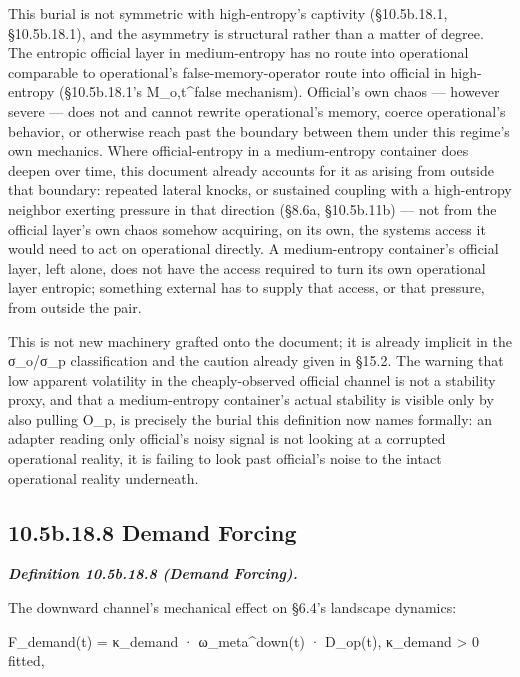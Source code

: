 \documentclass[
]{article}
\begin{document}
This burial is not symmetric with high-entropy's captivity (§10.5b.18.1,
§10.5b.18.1), and the asymmetry is structural rather than a matter of
degree. The entropic official layer in medium-entropy has no route into
operational comparable to operational's false-memory-operator route into
official in high-entropy (§10.5b.18.1's M\_o,t\^{}false mechanism).
Official's own chaos --- however severe --- does not and cannot rewrite
operational's memory, coerce operational's behavior, or otherwise reach
past the boundary between them under this regime's own mechanics. Where
official-entropy in a medium-entropy container does deepen over time,
this document already accounts for it as arising from outside that
boundary: repeated lateral knocks, or sustained coupling with a
high-entropy neighbor exerting pressure in that direction (§8.6a,
§10.5b.11b) --- not from the official layer's own chaos somehow
acquiring, on its own, the systems access it would need to act on
operational directly. A medium-entropy container's official layer, left
alone, does not have the access required to turn its own operational
layer entropic; something external has to supply that access, or that
pressure, from outside the pair.

This is not new machinery grafted onto the document; it is already
implicit in the σ\_o/σ\_p classification and the caution already given
in §15.2. The warning that low apparent volatility in the
cheaply-observed official channel is not a stability proxy, and that a
medium-entropy container's actual stability is visible only by also
pulling O\_p, is precisely the burial this definition now names
formally: an adapter reading only official's noisy signal is not looking
at a corrupted operational reality, it is failing to look past
official's noise to the intact operational reality underneath.

\hypertarget{b.18.8-demand-forcing}{%
\subsection{10.5b.18.8 Demand Forcing}\label{b.18.8-demand-forcing}}

\emph{\textbf{Definition 10.5b.18.8 (Demand Forcing).}}

The downward channel's mechanical effect on §6.4's landscape dynamics:

F\_demand(t) = κ\_demand · ω\_meta\^{}down(t) · D\_op(t), κ\_demand
\textgreater{} 0 fitted,
\end{document}
